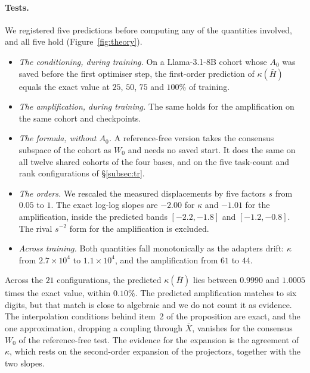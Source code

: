 \paragraph{Tests.} We registered five predictions before computing any of the
quantities involved, and all five hold (Figure~\ref{fig:theory}).
\begin{itemize}[leftmargin=*,itemsep=1pt,topsep=2pt]
\item \emph{The conditioning, during training.} On a Llama-3.1-8B cohort whose
  $A_0$ was saved before the first optimiser step, the first-order prediction
  of $\kappa(\bar H)$ equals the exact value at $25$, $50$, $75$ and $100\%$
  of training.
\item \emph{The amplification, during training.} The same holds for the
  amplification on the same cohort and checkpoints.
\item \emph{The formula, without $A_0$.} A reference-free version takes the
  consensus subspace of the cohort as $W_0$ and needs no saved start. It does
  the same on all twelve shared cohorts of the four bases, and on the five
  task-count and rank configurations of \S\ref{subsec:tr}.
\item \emph{The orders.} We rescaled the measured displacements by five
  factors $s$ from $0.05$ to $1$. The exact log-log slopes are $-2.00$ for
  $\kappa$ and $-1.01$ for the amplification, inside the predicted bands
  $[-2.2, -1.8]$ and $[-1.2, -0.8]$. The rival $s^{-2}$ form for the
  amplification is excluded.
\item \emph{Across training.} Both quantities fall monotonically as the
  adapters drift: $\kappa$ from $2.7\times10^{4}$ to $1.1\times10^{4}$, and
  the amplification from $61$ to $44$.
\end{itemize}
Across the $21$ configurations, the predicted $\kappa(\bar H)$ lies between
$0.9990$ and $1.0005$ times the exact value, within $0.10\%$. The predicted
amplification matches to six digits, but that match is close to algebraic and
we do not count it as evidence. The interpolation conditions behind item~2 of
the proposition are exact, and the one approximation, dropping a coupling
through $\bar X$, vanishes for the consensus $W_0$ of the reference-free test.
The evidence for the expansion is the agreement of $\kappa$, which rests on
the second-order expansion of the projectors, together with the two slopes.

